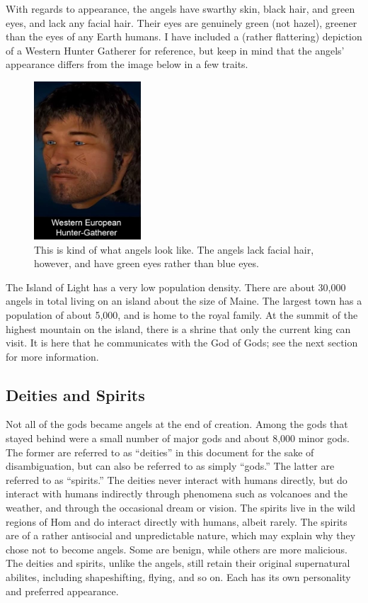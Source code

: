 \documentclass{article}
\begin{document}
With regards to appearance, the angels have swarthy skin, black hair, and green eyes, and lack any facial hair. Their eyes are genuinely green (not hazel), greener than the eyes of any Earth humans. I have included a (rather flattering) depiction of a Western Hunter Gatherer for reference, but keep in mind that the angels' appearance differs from the image below in a few traits.

\begin{figure}[h]
  \centering
  \includegraphics[width=4cm]{whg}
  \caption{This is kind of what angels look like. The angels lack facial hair, however, and have green eyes rather than blue eyes.}
\end{figure}

The Island of Light has a very low population density. There are about 30,000 angels in total living on an island about the size of Maine. The largest town has a population of about 5,000, and is home to the royal family. At the summit of the highest mountain on the island, there is a shrine that only the current king can visit. It is here that he communicates with the God of Gods; see the next section for more information.

\subsection{Deities and Spirits}

Not all of the gods became angels at the end of creation. Among the gods that stayed behind were a small number of major gods and about 8,000 minor gods. The former are referred to as ``deities'' in this document for the sake of disambiguation, but can also be referred to as simply ``gods.'' The latter are referred to as ``spirits.'' The deities never interact with humans directly, but do interact with humans indirectly through phenomena such as volcanoes and the weather, and through the occasional dream or vision. The spirits live in the wild regions of Hom and do interact directly with humans, albeit rarely. The spirits are of a rather antisocial and unpredictable nature, which may explain why they chose not to become angels. Some are benign, while others are more malicious. The deities and spirits, unlike the angels, still retain their original supernatural abilites, including shapeshifting, flying, and so on. Each has its own personality and preferred appearance.
\end{document}
